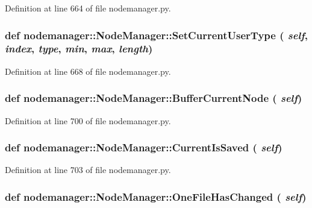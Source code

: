 Definition at line 664 of file nodemanager.py.\hypertarget{classnodemanager_1_1NodeManager_ab2a81a217a4fa5bb8bb79e9991e9db4}{
\subsubsection[SetCurrentUserType]{\setlength{\rightskip}{0pt plus 5cm}def nodemanager::Node\-Manager::Set\-Current\-User\-Type ( {\em self},  {\em index},  {\em type},  {\em min},  {\em max},  {\em length})}}
\label{classnodemanager_1_1NodeManager_ab2a81a217a4fa5bb8bb79e9991e9db4}




Definition at line 668 of file nodemanager.py.\hypertarget{classnodemanager_1_1NodeManager_bb79b2acd54ebcac7e97fae36b234b18}{
\subsubsection[BufferCurrentNode]{\setlength{\rightskip}{0pt plus 5cm}def nodemanager::Node\-Manager::Buffer\-Current\-Node ( {\em self})}}
\label{classnodemanager_1_1NodeManager_bb79b2acd54ebcac7e97fae36b234b18}




Definition at line 700 of file nodemanager.py.\hypertarget{classnodemanager_1_1NodeManager_df2cf6733f713115af3f75258f756e44}{
\subsubsection[CurrentIsSaved]{\setlength{\rightskip}{0pt plus 5cm}def nodemanager::Node\-Manager::Current\-Is\-Saved ( {\em self})}}
\label{classnodemanager_1_1NodeManager_df2cf6733f713115af3f75258f756e44}




Definition at line 703 of file nodemanager.py.\hypertarget{classnodemanager_1_1NodeManager_4e09d1ae59275bac43fb3462f945b2b7}{
\subsubsection[OneFileHasChanged]{\setlength{\rightskip}{0pt plus 5cm}def nodemanager::Node\-Manager::One\-File\-Has\-Changed ( {\em self})}}
\label{classnodemanager_1_1NodeManager_4e09d1ae59275bac43fb3462f945b2b7}




